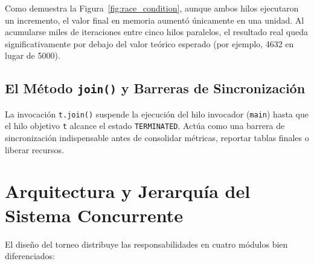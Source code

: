 \documentclass[11pt,letterpaper]{article}
\begin{document}
Como demuestra la Figura~\ref{fig:race_condition}, aunque ambos hilos ejecutaron un incremento, el valor final en memoria aumentó únicamente en una unidad. Al acumularse miles de iteraciones entre cinco hilos paralelos, el resultado real queda significativamente por debajo del valor teórico esperado (por ejemplo, 4632 en lugar de 5000).

\subsection{El Método \texttt{join()} y Barreras de Sincronización}
La invocación \texttt{t.join()} suspende la ejecución del hilo invocador (\texttt{main}) hasta que el hilo objetivo \texttt{t} alcance el estado \texttt{TERMINATED}. Actúa como una barrera de sincronización indispensable antes de consolidar métricas, reportar tablas finales o liberar recursos.

\section{Arquitectura y Jerarquía del Sistema Concurrente}

El diseño del torneo distribuye las responsabilidades en cuatro módulos bien diferenciados:
\end{document}
